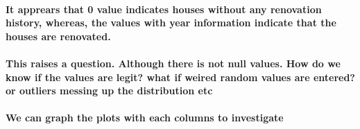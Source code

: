 \documentclass[11pt]{article}
\begin{document}
    \paragraph{It apprears that 0 value indicates houses without any
renovation history, whereas, the values with year information indicate
that the houses are
renovated.}\label{it-apprears-that-0-value-indicates-houses-without-any-renovation-history-whereas-the-values-with-year-information-indicate-that-the-houses-are-renovated.}

    \paragraph{This raises a question. Although there is not null values.
How do we know if the values are legit? what if weired random values are
entered? or outliers messing up the distribution
etc}\label{this-raises-a-question.-although-there-is-not-null-values.-how-do-we-know-if-the-values-are-legit-what-if-weired-random-values-are-entered-or-outliers-messing-up-the-distribution-etc}

\paragraph{We can graph the plots with each columns to
investigate}\label{we-can-graph-the-plots-with-each-columns-to-investigate}
\end{document}
